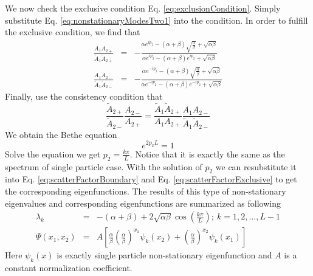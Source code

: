 \documentclass[12pt,a4paper]{article}
\begin{document}
We now check the exclusive condition Eq. \eqref{eq:exclusionCondition}. Simply
substitute Eq.  \eqref{eq:nonstationaryModesTwo1} into the condition. In order to
fulfill the exclusive condition, we find that 
\begin{subequations}
    \label{eq:scatterFactorExclusive}
    \begin{eqnarray}
        \frac{A_{1}A_{2+}}{\tilde{A}_{1}\tilde{A}_{2+}} & = & -\frac{\alpha
            e^{ip_2}-(\alpha+\beta) \sqrt{\frac{\alpha}{\beta}} +
            \sqrt{\alpha\beta} }{\alpha e^{ip_2} -(\alpha+\beta)e^{ip_2} +
            \sqrt{\alpha\beta} } \\
        \frac{A_{1}A_{2-}}{\tilde{A}_{1}\tilde{A}_{2-}} & = & -\frac{\alpha
            e^{-ip_2}-(\alpha+\beta) \sqrt{\frac{\alpha}{\beta}} +
            \sqrt{\alpha\beta} }{\alpha e^{-ip_2} -(\alpha+\beta)e^{-ip_2} +
            \sqrt{\alpha\beta} } 
    \end{eqnarray}
\end{subequations}
Finally, use the consistency condition that
\begin{equation}
    \label{eq:consistencyConditionTwo}
    \frac{\tilde{A}_{2+}}{\tilde{A}_{2-}}\frac{A_{2-}}{A_{2+}} = 
    \frac{\tilde{A}_{1}\tilde{A}_{2+}}{A_{1}A_{2+}}
    \frac{A_{1}A_{2-}}{\tilde{A}_{1}\tilde{A}_{2-}}
\end{equation}
We obtain the Bethe equation 
\begin{equation}
    \label{eq:betheEqTwo1}
    e^{2p_2L} = 1
\end{equation}
Solve the equation we get $p_2=\frac{k\pi}{L}$. Notice that it is exactly the
same as the spectrum of single particle case. With the solution of $p_2$ we can
resubstitute it into Eq. \eqref{eq:scatterFactorBoundary} and Eq.
\eqref{eq:scatterFactorExclusive} to get the corresponding eigenfunctions. 
The results of this type of non-stationary eigenvalues and corresponding
eigenfunctions are summarized as following 
\begin{subequations}
    \label{eq:eigenTwo}
    \begin{eqnarray}
        \label{eq:eigenvaluesTwo}
        \lambda_k & = &
        -(\alpha+\beta) + 2\sqrt{\alpha\beta}\cos(\frac{k\pi}{L});
        ~k=1,2,\dots, L-1  \\
        \label{eq:eigenvectorsTwo}
        \Psi(x_1, x_2) & = & A\left[ \frac{\alpha}{\beta}
            \left(\frac{\alpha}{\beta}
            \right)^{x_1}\psi_k(x_2)+\left(\frac{\alpha}{\beta}\right)^{x_2}
            \psi_k(x_1) \right]
    \end{eqnarray}
\end{subequations}
Here $\psi_k(x)$ is exactly single particle non-stationary eigenfunction and
$A$ is a constant normalization coefficient.
\end{document}
